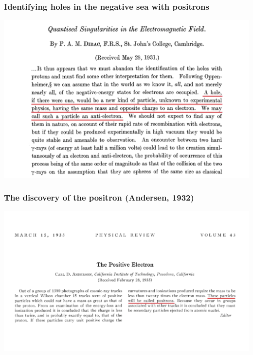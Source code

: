 \begin{frame}
\frametitle{Identifying holes in the negative sea with positrons}

\includegraphics[scale=0.3]{img/diracPositrons.png}
\end{frame}

\begin{frame}
\frametitle{The discovery of the positron (Andersen, 1932)}

\includegraphics[scale=0.3]{img/AndersonPaper.png}
\end{frame}

%
%

%

%
%
%
%
%






